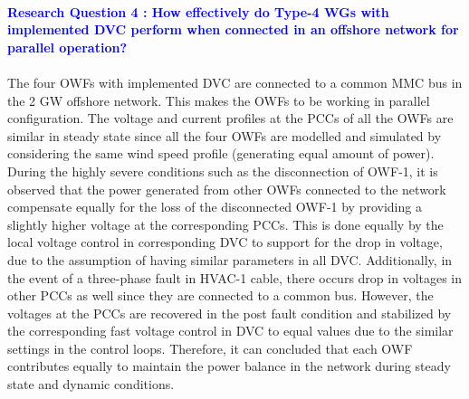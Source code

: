 \paragraph{\textcolor{blue}{Research Question 4 : How effectively do Type-4 \gls{WG}s with implemented \gls{DVC} perform when connected in an offshore network for parallel operation?}}

\paragraph{} The four \gls{OWF}s with implemented \gls{DVC} are connected to a common \gls{MMC} bus in the 2 GW offshore network. This makes the \gls{OWF}s to be working in parallel configuration. The voltage and current profiles at the \gls{PCC}s of all the \gls{OWF}s are similar in steady state since all the four \gls{OWF}s are modelled and simulated by considering the same wind speed profile (generating equal amount of power). During the highly severe conditions such as the disconnection of \gls{OWF}-1, it is observed that the power generated from other \gls{OWF}s connected to the network compensate equally for the loss of the disconnected \gls{OWF}-1 by providing a slightly higher voltage at the corresponding \gls{PCC}s. This is done equally by the local voltage control in corresponding \gls{DVC} to support for the drop in voltage, due to the assumption of having similar parameters in all \gls{DVC}. Additionally, in the event of a three-phase fault in \gls{HVAC}-1 cable, there occurs drop in voltages in other \gls{PCC}s as well since they are connected to a common bus. However, the voltages at the \gls{PCC}s are recovered in the post fault condition and stabilized by the corresponding fast voltage control in \gls{DVC} to equal values due to the similar settings in the control loops. Therefore, it can concluded that each \gls{OWF} contributes equally to maintain the power balance in the network during steady state and dynamic conditions.   

